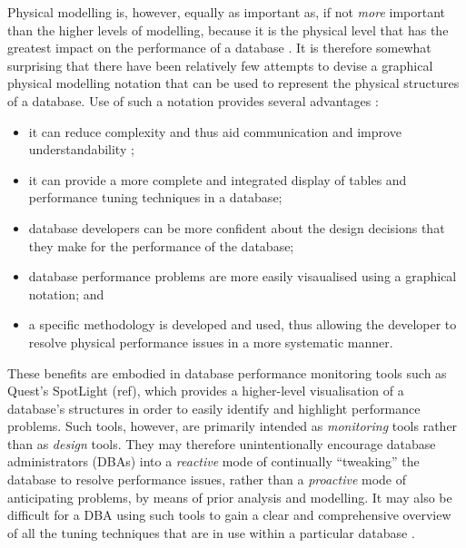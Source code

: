 \documentclass{llncs}
\begin{document}
Physical modelling is, however, equally as important as, if not \emph{more} important than the higher levels of modelling, because it is the physical level that has the greatest impact on the performance of a database \cite{BeDa-P-2003}. It is therefore somewhat surprising that there have been relatively few attempts to devise a graphical physical modelling notation that can be used to represent the physical structures of a database. Use of such a notation provides several advantages \cite{BeDa-P-1992-PDD,Conn-TM-2002,Will-J-1992}:

\begin{itemize}

	\item it can reduce complexity and thus aid communication and improve understandability \cite{Tuft-ER-1997};

	\item it can provide a more complete and integrated display of tables and performance tuning techniques in a database;
	
	\item database developers can be more confident about the design decisions that they make for the performance of the database;
	
	\item database performance problems are more easily visaualised using a graphical notation; and
	
	\item a specific methodology is developed and used, thus allowing the developer to resolve physical performance issues in a more systematic manner.

\end{itemize}

These benefits are embodied in database performance monitoring tools such as Quest's SpotLight (ref), which provides a higher-level visualisation of a database's structures in order to easily identify and highlight performance problems. Such tools, however, are primarily intended as \emph{monitoring} tools rather than as \emph{design} tools. They may therefore unintentionally encourage database administrators (DBAs) into a \emph{reactive} mode of continually ``tweaking'' the database to resolve performance issues, rather than a \emph{proactive} mode of anticipating problems, by means of prior analysis and modelling. It may also be difficult for a DBA using such tools to gain a clear and comprehensive overview of all the tuning techniques that are in use within a particular database \cite{Core-MJ-1997-OracleDW}.
\end{document}
